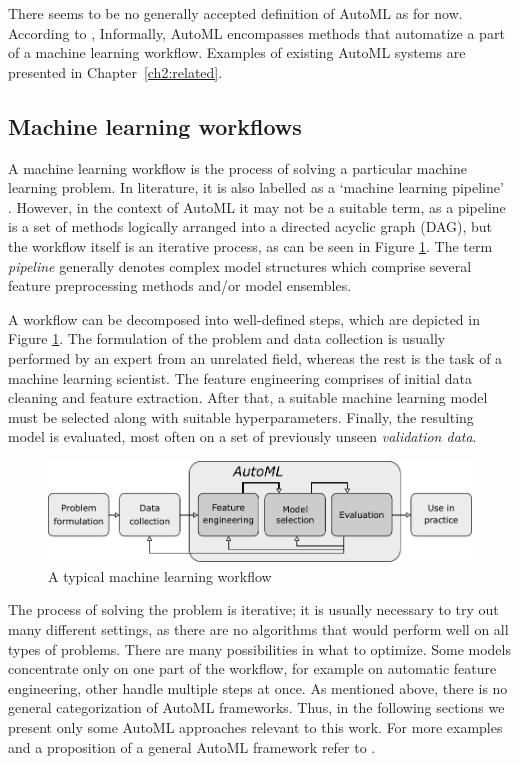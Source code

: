 There seems to be no generally accepted definition of AutoML as for now.
According to \cite{DBLP:journals/corr/abs-1810-13306},
Informally, AutoML encompasses methods that automatize a part of a machine
learning workflow. Examples of existing AutoML systems are presented in
Chapter~\ref{ch2:related}.

\subsection{Machine learning workflows}
A machine learning workflow is the process of solving a particular machine
learning problem. In literature, it is also labelled as a `machine learning
pipeline' \cite{DBLP:journals/corr/abs-1810-13306}. However, in the context
of AutoML it may not be a suitable term, as a pipeline is a set of methods
logically arranged into a directed acyclic graph (DAG), but the workflow itself
is an iterative process, as can be seen in Figure \ref{pic01:workflow}.
The term \emph{pipeline} generally denotes complex model structures which
comprise several feature preprocessing methods and/or model
ensembles.

A workflow can be decomposed into well-defined steps, which are depicted in
Figure \ref{pic01:workflow}. The formulation of the problem and data collection
is usually performed by an expert from an unrelated field, whereas the rest is
the task of a machine learning scientist. The feature engineering comprises
of initial data cleaning and feature extraction.
After that, a suitable machine learning model must be selected along with
suitable hyperparameters. Finally, the resulting model is evaluated, most
often on a set of previously unseen \emph{validation data}.

\begin{figure}[ht]\centering
\includegraphics[width=\textwidth]{../img/workflow-pdfa.pdf}
\caption{A typical machine learning workflow}
\label{pic01:workflow}
\end{figure}

The process of solving the problem is iterative; it is usually necessary to try
out many different settings, as there are no algorithms that would perform
well on all types of problems.
There are many possibilities in what to optimize. Some models concentrate only
on one part of the workflow, for example on automatic feature engineering,
other handle multiple steps at once. As mentioned above, there is no general
categorization %
of AutoML frameworks. Thus, in the following sections we present only some
AutoML approaches relevant to this work. For more examples and a proposition
of a general AutoML framework refer to \cite{DBLP:journals/corr/abs-1810-13306}.

